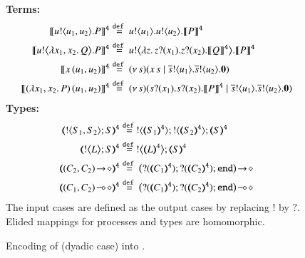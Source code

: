 
\begin{figure}[t]
{\bf Terms:} 
\begin{align*}
	 \pmap{\bout{u}{u_1, u_2} P}{4} &\defeq \bout{u}{u_1} \bout{u}{u_2} \pmap{P}{4}
	\\
	 \pmap{\bbout{u}{\abs{x_1, x_2} Q} P}{4} &\defeq \bbout{u}{\abs{z}\binp{z}{x_1} \binp{z}{x_2} \pmap{Q}{4}} \pmap{P}{4} %
	\\
 \pmap{\appl{x}{(u_1, u_2)}}{4} &\defeq \newsp{s}{\appl{x}{s} \Par \bout{\dual{s}}{u_1}   \bout{\dual{s}}{u_2} \inact}
	\\
	\pmap{\appl{(\abs{x_1,x_2}{P})}{(u_1, u_2)}}{4} &\defeq
	\newsp{s}{\binp{s}{x_1}  \binp{s}{x_2} \pmap{P}{4} \Par \bout{\dual{s}}{u_1}  \bout{\dual{s}}{u_2} \inact} 
\end{align*}
{\bf Types:}
\begin{align*}
		\tmap{\btout{S_1, S_2}S}{4} &\defeq \btout{\tmap{S_1}{4}}  \btout{\tmap{S_2}{4}}\tmap{S}{4}
	\\
	 \tmap{\bbtout{L} S}{4} & \defeq  \bbtout{\mapt{L}^{4}}\mapt{S}^{4}
	\\
	  \tmap{\shot{(C_2,  C_2)}}{4} &\defeq \shot{\big(\btinp{\tmap{C_1}{4}} \btinp{\tmap{C_2}{4}}\tinact\big)}
	\\
	  \tmap{\lhot{(C_1,  C_2)}}{4} &\defeq \lhot{\big(\btinp{\tmap{C_1}{4}}  \btinp{\tmap{C_2}{4}}\tinact\big)}
\end{align*}
The input cases are defined as the output cases by replacing $!$ by $?$. 
Elided mappings for  processes and types are 
homomorphic.
\caption{\label{f:enc:poltomon}Encoding of \PHOp (dyadic case) into \HOp. }
\end{figure}

